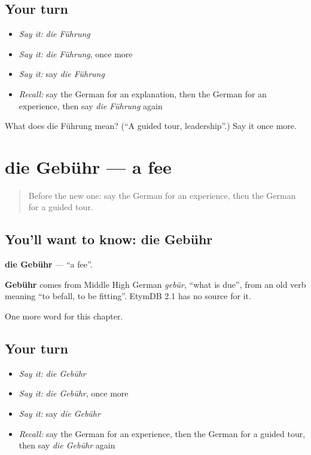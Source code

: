 \subsection*{Your turn}
\begin{itemize}
\raggedright
  \item \emph{Say it:} \emph{die Führung}
  \item \emph{Say it:} \emph{die Führung}, once more
  \item \emph{Say it:} say \emph{die Führung}
  \item \emph{Recall:} say the German for an explanation, then the German for an experience, then say \emph{die Führung} again
\end{itemize}

\begin{tcolorbox}[breakable,colback=teal!4,colframe=teal!35!black,title={Before you move on}]
What does die Führung mean? (\textquotedblleft{}A guided tour, leadership\textquotedblright{}.) Say it once more.
\end{tcolorbox}
\section[die Gebühr]{die Gebühr — a fee}

\label{lesson:GE-C229-gebuehr}



\begin{quote}
Before the new one: say the German for an experience, then the German for a guided tour.
\end{quote}

\subsection*{You'll want to know: die Gebühr}
\textbf{die Gebühr} — \textquotedblleft{}a fee\textquotedblright{}.

\begin{cousinweb}
\textbf{Gebühr} comes from Middle High German \emph{gebür}, \textquotedblleft{}what is due\textquotedblright{}, from an old verb meaning \textquotedblleft{}to befall, to be fitting\textquotedblright{}. EtymDB 2.1 has no source for it.
\end{cousinweb}

\begin{grammarlens}[title={What you've built}]
One more word for this chapter.
\end{grammarlens}

\subsection*{Your turn}
\begin{itemize}
\raggedright
  \item \emph{Say it:} \emph{die Gebühr}
  \item \emph{Say it:} \emph{die Gebühr}, once more
  \item \emph{Say it:} say \emph{die Gebühr}
  \item \emph{Recall:} say the German for an experience, then the German for a guided tour, then say \emph{die Gebühr} again
\end{itemize}

